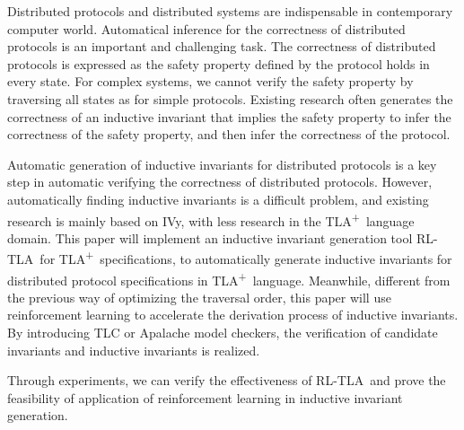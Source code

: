 \documentclass[
    type = bachelor,
    degree = academic,
    twoside,
    fontset = win
]
{njuthesis}
\newcommand{\TLA}{TLA\textsuperscript{+}}
\newcommand{\rltla}{RL-TLA}
\begin{document}
\begin{abstract*}
    Distributed protocols and distributed systems are indispensable in contemporary computer world. Automatical inference for the correctness of distributed protocols is an important and challenging task.
    The correctness of distributed protocols is expressed as the safety property defined by the protocol holds in every state.
    For complex systems, we cannot verify the safety property by traversing all states as for simple protocols.
    Existing research often generates the correctness of an inductive invariant that implies the safety property to infer the correctness of the safety property, and then infer the correctness of the protocol.
    
    Automatic generation of inductive invariants for distributed protocols is a key step in automatic verifying the correctness of distributed protocols.
    However, automatically finding inductive invariants is a difficult problem, and existing research is mainly based on IVy, with less research in the \TLA \ language domain.
    This paper will implement an inductive invariant generation tool \rltla \ for \TLA \ specifications, to automatically generate inductive invariants for distributed protocol specifications in \TLA \ language.
    Meanwhile, different from the previous way of optimizing the traversal order, this paper will use reinforcement learning to accelerate the derivation process of inductive invariants.
    By introducing TLC or Apalache model checkers, the verification of candidate invariants and inductive invariants is realized.

    Through experiments, we can verify the effectiveness of \rltla \ and prove the feasibility of application of reinforcement learning in inductive invariant generation.

\end{abstract*}

\tableofcontents

\mainmatter












\printbibliography
\end{document}
